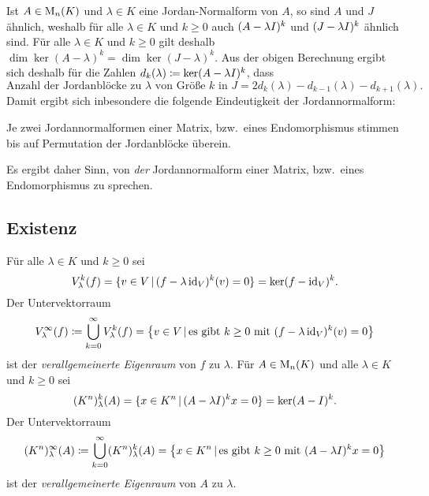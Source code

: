 Ist $A \in \matrices{n}{K}$ und $\lambda \in K$ eine Jordan-Normalform von $A$, so sind $A$ und $J$ ähnlich, weshalb für alle $\lambda \in K$ und $k \geq 0$ auch $(A - \lambda \Id)^k$ und $(J - \lambda \Id)^k$ ähnlich sind.
Für alle $\lambda \in K$ und $k \geq 0$ gilt deshalb $\dim \ker (A - \lambda)^k = \dim \ker (J - \lambda)^k$.
Aus der obigen Berechnung ergibt sich deshalb für die Zahlen $d_k(\lambda) \coloneqq \ker (A - \lambda \Id)^k$, dass
\[
    \text{Anzahl der Jordanblöcke zu $\lambda$ von Größe $k$ in $J$}
  = 2 d_k(\lambda) - d_{k-1}(\lambda) - d_{k+1}(\lambda).
\]
Damit ergibt sich inbesondere die folgende Eindeutigkeit der Jordannormalform:

\begin{proposition}
  Je zwei Jordannormalformen einer Matrix, bzw.\ eines Endomorphismus stimmen bis auf Permutation der Jordanblöcke überein.
\end{proposition}

Es ergibt daher Sinn, von \emph{der} Jordannormalform einer Matrix, bzw.\ eines Endomorphismus zu sprechen.


\subsection{Existenz}

\begin{definition}
  Für alle $\lambda \in K$ und $k \geq 0$ sei
  \[
      \heigenspace{V}{f}{\lambda}{k}
    = \{ v \in V \suchthat (f - \lambda \id_V)^k(v) = 0 \}
    = \ker (f - \id_V)^k.
  \]
  Der Untervektorraum
  \[
              \geigenspace{V}{f}{\lambda}
    \coloneqq \bigcup_{k=0}^\infty \heigenspace{V}{f}{\lambda}{k}
    =         \left\{
                v \in V
              \suchthat
                \text{es gibt $k \geq 0$ mit $(f - \lambda \id_V)^k(v) = 0$}
              \right\}
  \]
  ist der \emph{verallgemeinerte Eigenraum} von $f$ zu $\lambda$.
  Für $A \in \matrices{n}{K}$ und alle $\lambda \in K$ und $k \geq 0$ sei
  \[
      \heigenspace{(K^n)}{A}{\lambda}{k}
    = \{ x \in K^n \suchthat (A - \lambda \Id)^k x = 0 \}
    = \ker (A - \Id)^k.
  \]
  Der Untervektorraum
  \[
              \geigenspace{(K^n)}{A}{\lambda}
    \coloneqq \bigcup_{k=0}^\infty \heigenspace{(K^n)}{A}{\lambda}{k}
    =         \left\{
                x \in K^n
              \suchthat
                \text{es gibt $k \geq 0$ mit $(A - \lambda \Id)^k x = 0$}
              \right\}
  \]
  ist der \emph{verallgemeinerte Eigenraum} von $A$ zu $\lambda$.
\end{definition}

